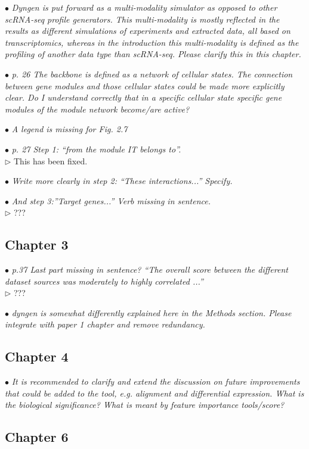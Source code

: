 \documentclass[10pt]{article}
\newcommand{\exam}[2][\  ]{\hspace{0pt}\marginpar{\color{red}#1}$\bullet$ \textit{#2}}
\newcommand{\imp}[1]{{\color{red} #1}}
\newcommand{\answ}[1]{{\color{blue} $\triangleright$ #1}}
\newcommand{\bigexclaim}{\raisebox{-0.1em}{\BigTriangleUp}\hspace{-0.32em}\llap{\small\textbf{!}}\hspace{0.32em}}
\newcommand{\tagimp}{\bigexclaim}
\begin{document}
{{\exam[\tagimp]{Dyngen is put forward as a multi-modality simulator as opposed to other scRNA-seq profile
generators. \imp{This multi-modality is mostly reflected in the results as different simulations of
experiments and extracted data, all based on transcriptomics, whereas in the introduction
this multi-modality is defined as the profiling of another data type than scRNA-seq.} Please
clarify this in this chapter.}


\exam{p. 26 The backbone is defined as a network of cellular states. The connection between gene
modules and those cellular states could be made more explicitly clear. Do I understand
correctly that in a specific cellular state specific gene modules of the module network
become/are active?}

\exam{A legend is missing for Fig. 2.7}

\exam{p. 27 Step 1: “from the module IT belongs to”.} \\
\answ{This has been fixed.}

\exam{Write more clearly in step 2: “These
interactions...” Specify.}

\exam{And step 3:”Target genes...” Verb missing in sentence.} \\
\answ{???}

\subsection{Chapter 3}

\exam{p.37 Last part missing in sentence? “The overall score between the different dataset sources
	was moderately to highly correlated ...”} \\
\answ{???}

\exam{dyngen is somewhat differently explained here in the Methods section. Please integrate with
	paper 1 chapter and remove redundancy.}

\subsection{Chapter 4}

\exam{It is recommended to clarify and extend the discussion on future improvements that could be
	added to the tool, e.g. alignment and differential expression. What is the biological
	significance? What is meant by feature importance tools/score?}

\subsection{Chapter 6}


}}
\end{document}
